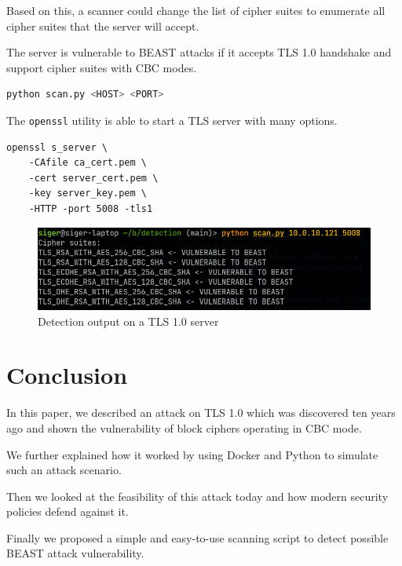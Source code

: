 \documentclass{acm_proc_article-sp}
\begin{document}
Based on this, a scanner could change the list of cipher suites to enumerate all
cipher suites that the server will accept.

The server is vulnerable to BEAST attacks if it accepts TLS 1.0 handshake and support
cipher suites with CBC modes.

\begin{lstlisting}[language=bash]
python scan.py <HOST> <PORT>
\end{lstlisting}

The \texttt{openssl} utility is able to start a TLS server with many options.

\begin{lstlisting}
openssl s_server \
    -CAfile ca_cert.pem \
    -cert server_cert.pem \
    -key server_key.pem \
    -HTTP -port 5008 -tls1
\end{lstlisting}

\begin{figure}[htb]
    \centering
    \includegraphics[keepaspectratio, width=\linewidth]{./figures/detection-output.png}
    \caption{Detection output on a TLS 1.0 server}
\end{figure}

\section{Conclusion}
In this paper, we described an attack on TLS 1.0 which was discovered ten years ago and shown
the vulnerability of block ciphers operating in CBC mode.

We further explained how it worked by using Docker and Python to simulate such an attack scenario.

Then we looked at the feasibility of this attack today and
how modern security policies defend against it.

Finally we proposed a simple and easy-to-use
scanning script to detect possible BEAST attack vulnerability.


%
%
\balancecolumns
\appendix
\end{document}
